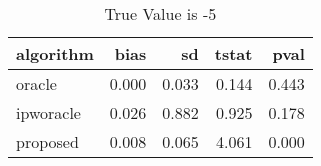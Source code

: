 \begin{table}[h!]
\caption{True Value is -5}
\centering
\begin{tabular}[t]{lrrrr}
\toprule
algorithm & bias & sd & tstat & pval\\
\midrule
oracle & 0.000 & 0.033 & 0.144 & 0.443\\
ipworacle & 0.026 & 0.882 & 0.925 & 0.178\\
proposed & 0.008 & 0.065 & 4.061 & 0.000\\
\bottomrule
\end{tabular}
\end{table}
